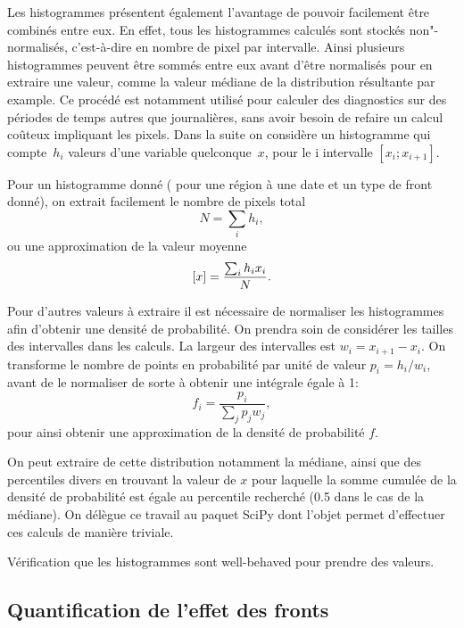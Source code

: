 Les histogrammes présentent également l'avantage de pouvoir facilement être combinés entre eux.
En effet, tous les histogrammes calculés sont stockés non"-normalisés, c'est-à-dire en nombre de pixel par intervalle. Ainsi plusieurs histogrammes peuvent être sommés entre eux avant d'être normalisés pour en extraire une valeur, comme la valeur médiane de la distribution résultante par example.
Ce procédé est notamment utilisé pour calculer des diagnostics sur des périodes de temps autres que journalières, sans avoir besoin de refaire un calcul coûteux impliquant les pixels.
Dans la suite on considère un histogramme qui compte~\(h_i\) valeurs d'une variable quelconque~\(x\), pour le i\ieme{} intervalle \(\left[x_i; x_{i+1} \right]\).

Pour un histogramme donné ( pour une région à une date et un type de front donné), on extrait facilement le nombre de pixels total
\begin{equation}
  N = \sum_i h_i,
\end{equation}
ou une approximation de la valeur moyenne
\begin{equation}
  \left[x\right] = \frac{\sum_i h_i x_i} {N}.
\end{equation} %

Pour d'autres valeurs à extraire il est nécessaire de normaliser les histogrammes afin d'obtenir une densité de probabilité. On prendra soin de considérer les tailles des intervalles dans les calculs.
La largeur des intervalles est \(w_i = x_{i+1}-x_i\). On transforme le nombre de points en probabilité par unité de valeur \(p_i = h_i / w_i \), avant de le normaliser de sorte à obtenir une intégrale égale à 1:
\begin{equation}
  f_i = \frac{p_i} {\sum_j p_j w_j},
\end{equation}
pour ainsi obtenir une approximation de la densité de probabilité \(f\).

On peut extraire de cette distribution notamment la médiane, ainsi que des percentiles divers en trouvant la valeur de \(x\) pour laquelle la somme cumulée de la densité de probabilité est égale au percentile recherché (0.5 dans le cas de la médiane).
On délègue ce travail au paquet SciPy dont l'objet  permet d'effectuer ces calculs de manière triviale.

Vérification que les histogrammes sont well-behaved pour prendre des valeurs.

\subsection{Quantification de l'effet des fronts}
\label{sec:extraction-surplus}

